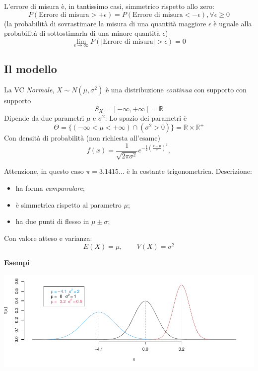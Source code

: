 \documentclass[
  11pt,
]{book}
\providecommand{\tightlist}{%
  \setlength{\itemsep}{0pt}\setlength{\parskip}{0pt}}
\theoremstyle{mytheoremstyle}
\theoremstyle{mydefstyle}
\begin{document}
L'errore di misura è, in tantissimo casi, simmetrico rispetto allo zero:
\[P(\text{Errore di misura}>+\epsilon)=P(\text{Errore di misura}<-\epsilon), \forall \epsilon\geq 0\]
(la probabilità di sovrastimare la misura di una quantità maggiore \(\epsilon\) è uguale alla probabilità di sottostimarla di una minore quantità \(\epsilon\))
\[\lim_{\epsilon\to\infty}P(|\text{Errore di misura}|> \epsilon)=0\]

\subsection{Il modello}\label{il-modello-2}

La VC \emph{Normale}, \(X\sim N(\mu,\sigma^2)\) è una distribuzione \emph{continua} con supporto
con supporto
\[
S_X=[-\infty,+\infty]=\mathbb{R}
\]
Dipende da due parametri \(\mu\) e \(\sigma^2\). Lo spazio dei parametri è
\[
\Theta=\{(-\infty<\mu<+\infty)\cap(\sigma^2>0)\}=\mathbb{R}\times\mathbb{R}^+
\]
Con densità di probabilità (non richiesta all'esame)
\[
f(x)=\frac {1}{\sqrt{2\pi\sigma^2}}e^{-\frac 1 2 \left(\frac{x-\mu}{\sigma}\right)^2}, 
\]

Attenzione, in questo caso \(\pi=3.1415...\) è la costante trigonometrica.
Descrizione:

\begin{itemize}
\tightlist
\item
  ha forma \emph{campanulare};
\item
  è simmetrica rispetto al parametro \(\mu\);
\item
  ha due punti di flesso in \(\mu\pm\sigma\);
\end{itemize}

Con valore atteso e varianza:
\[
E(X)=\mu, \qquad V(X)=\sigma^2
\]

\textbf{Esempi}

\begin{center}\includegraphics{Appunti_di_Statistica_2025_files/figure-latex/07c-Normale-3-1} \end{center}
\end{document}
